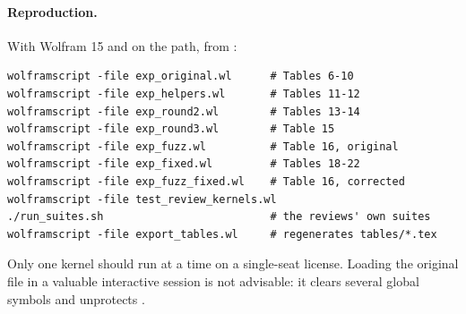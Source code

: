 \paragraph{Reproduction.} With Wolfram 15 and  on the path,
from :
\begin{lstlisting}[language={}]
wolframscript -file exp_original.wl      # Tables 6-10
wolframscript -file exp_helpers.wl       # Tables 11-12
wolframscript -file exp_round2.wl        # Tables 13-14
wolframscript -file exp_round3.wl        # Table 15
wolframscript -file exp_fuzz.wl          # Table 16, original
wolframscript -file exp_fixed.wl         # Tables 18-22
wolframscript -file exp_fuzz_fixed.wl    # Table 16, corrected
wolframscript -file test_review_kernels.wl
./run_suites.sh                          # the reviews' own suites
wolframscript -file export_tables.wl     # regenerates tables/*.tex
\end{lstlisting}
Only one kernel should run at a time on a single-seat license. Loading the
original file in a valuable interactive session is not advisable: it clears
several global symbols and unprotects .
